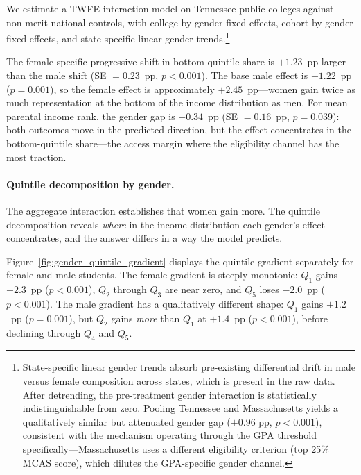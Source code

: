 We estimate a TWFE interaction model on Tennessee public colleges
against non-merit national controls, with college-by-gender fixed
effects, cohort-by-gender fixed effects, and state-specific linear
gender trends.\footnote{State-specific linear gender trends absorb
  pre-existing differential drift in male versus female composition
  across states, which is present in the raw data. After detrending,
  the pre-treatment gender interaction is statistically
  indistinguishable from zero. Pooling Tennessee and Massachusetts
  yields a qualitatively similar but attenuated gender gap ($+0.96$
  pp, $p < 0.001$), consistent with the mechanism operating through
  the GPA threshold specifically---Massachusetts uses a different
  eligibility criterion (top 25\% MCAS score), which dilutes the
  GPA-specific gender channel.}

The female-specific progressive shift in bottom-quintile share is
$+1.23$~pp larger than the male shift (SE $= 0.23$~pp,
$p < 0.001$). The base male effect is $+1.22$~pp ($p = 0.001$), so
the female effect is approximately $+2.45$~pp---women gain twice as
much representation at the bottom of the income distribution as men.
For mean parental income rank, the gender gap is $-0.34$~pp
(SE $= 0.16$~pp, $p = 0.039$): both outcomes move in the predicted
direction, but the effect concentrates in the bottom-quintile
share---the access margin where the eligibility channel has the most
traction.

\paragraph{Quintile decomposition by gender.}

The aggregate interaction establishes that women gain more. The
quintile decomposition reveals \emph{where} in the income distribution
each gender's effect concentrates, and the answer differs in a way
the model predicts.

Figure~\ref{fig:gender_quintile_gradient} displays the quintile
gradient separately for female and male students. The female gradient
is steeply monotonic: $Q_1$ gains $+2.3$~pp ($p < 0.001$), $Q_2$
through $Q_3$ are near zero, and $Q_5$ loses $-2.0$~pp
($p < 0.001$). The male gradient has a qualitatively different shape:
$Q_1$ gains $+1.2$~pp ($p = 0.001$), but $Q_2$ gains \emph{more}
than $Q_1$ at $+1.4$~pp ($p < 0.001$), before declining through
$Q_4$ and $Q_5$.

